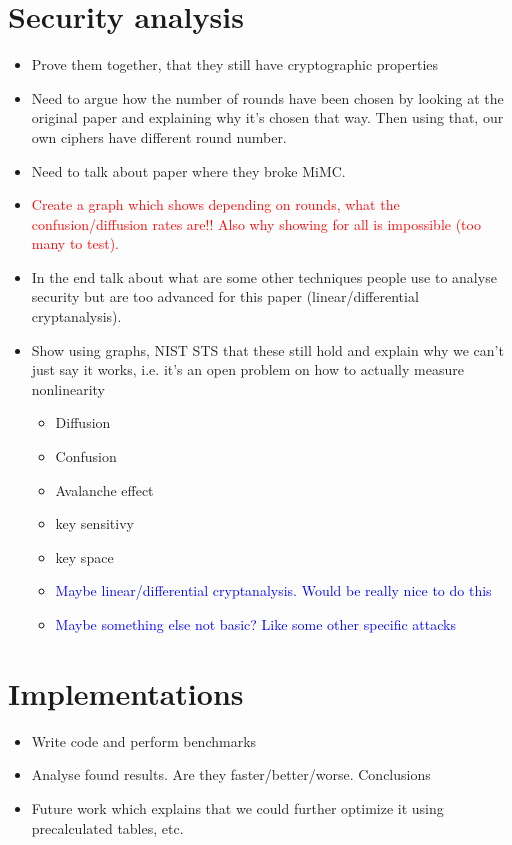 \documentclass{Resources/UoBLab1}
\theoremstyle{definition}
\begin{document}
\section{Security analysis}
\begin{itemize}
    \item Prove them together, that they still have cryptographic properties
    \item Need to argue how the number of rounds have been chosen by looking at the original paper and explaining why it's chosen that way. Then using that, our own ciphers have different round number.
    \item Need to talk about paper where they broke MiMC.
    \item \textcolor{red}{Create a graph which shows depending on rounds, what the confusion/diffusion rates are!! Also why showing for all is impossible (too many to test).}
    \item In the end talk about what are some other techniques people use to analyse security but are too advanced for this paper (linear/differential cryptanalysis).
    \item Show using graphs, NIST STS that these still hold and explain why we can't just say it works, i.e. it's an open problem on how to actually measure nonlinearity \begin{itemize}
        \item Diffusion
        \item Confusion
        \item Avalanche effect
        \item key sensitivy
        \item key space
        \item \textcolor{blue}{Maybe linear/differential cryptanalysis. Would be really nice to do this}
        \item \textcolor{blue}{Maybe something else not basic? Like some other specific attacks}
    \end{itemize}
\end{itemize}


\section{Implementations}\label{Implementations}
\begin{itemize}
    \item Write code and perform benchmarks
    \item Analyse found results. Are they faster/better/worse. Conclusions
    \item Future work which explains that we could further optimize it using precalculated tables, etc.
\end{itemize}
\end{document}
